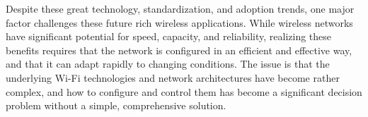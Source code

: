 %


Despite these great technology, standardization, and adoption trends, one major factor challenges these future rich wireless applications. While wireless networks have significant potential for speed, capacity, and reliability, realizing these benefits requires that the network is configured in an efficient and effective way, and that it can adapt rapidly to changing conditions. The issue is that the underlying Wi-Fi technologies and network architectures have become rather complex, and how to configure and control them has become a significant decision problem without a simple, comprehensive solution.

